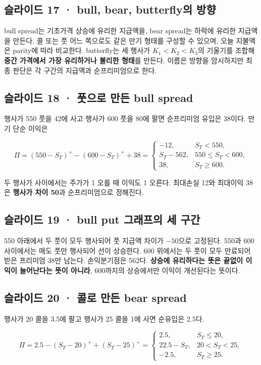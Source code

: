 \documentclass[11pt,a4paper]{article}
\begin{document}
\subsection{슬라이드 17 · bull, bear, butterfly의 방향}
bull spread는 기초가격 상승에 유리한 지급액을, bear spread는 하락에 유리한 지급액을 만든다. 콜 또는 풋 어느 쪽으로도 같은 만기 형태를 구성할 수 있으며, 오늘 지불액은 parity에 따라 비교한다. butterfly는 세 행사가 $K_1<K_2<K_3$의 기울기를 조합해 \textbf{중간 가격에서 가장 유리하거나 불리한 형태}를 만든다. 이름은 방향을 암시하지만 최종 판단은 각 구간의 지급액과 순프리미엄으로 한다.\par

\subsection{슬라이드 18 · 풋으로 만든 bull spread}
행사가 550 풋을 42에 사고 행사가 600 풋을 80에 팔면 순프리미엄 유입은 38이다. 만기 단순 이익은\par

\[
\Pi=(550-S_T)^+-(600-S_T)^++38
=\begin{cases}-12,&S_T<550,\\S_T-562,&550\leq S_T<600,\\38,&S_T\geq600.\end{cases}
\]

두 행사가 사이에서는 주가가 1 오를 때 이익도 1 오른다. 최대손실 12와 최대이익 38은 \textbf{행사가 차이 50}과 순프리미엄으로 정해진다.\par

\subsection{슬라이드 19 · bull put 그래프의 세 구간}
550 아래에서 두 풋이 모두 행사되어 풋 지급액 차이가 $-50$으로 고정된다. 550과 600 사이에서는 매도 풋만 행사되어 선이 상승한다. 600 위에서는 두 풋이 모두 만료되어 받은 프리미엄 38만 남는다. 손익분기점은 562다. \textbf{상승에 유리하다는 뜻은 끝없이 이익이 늘어난다는 뜻이 아니라}, 600까지의 상승에서만 이익이 개선된다는 뜻이다.\par

\subsection{슬라이드 20 · 콜로 만든 bear spread}
행사가 20 콜을 3.5에 팔고 행사가 25 콜을 1에 사면 순유입은 2.5다.\par

\[
\Pi=2.5-(S_T-20)^++(S_T-25)^+
=\begin{cases}2.5,&S_T\leq20,\\22.5-S_T,&20<S_T<25,\\-2.5,&S_T\geq25.\end{cases}
\]
\end{document}
